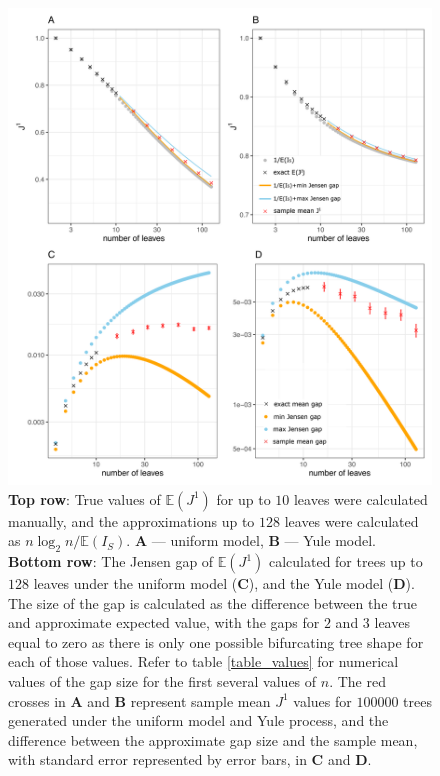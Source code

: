 \begin{figure}[h]
    \centering
    \includegraphics[width=\textwidth]{Chapter_2/figures/jensen_plots_final_edited.pdf}
    \caption{\textbf{Top row}: True values of $\mathbb E(J^1)$ for up to $10$
    leaves were calculated manually, and the approximations up to $128$ leaves
    were calculated as $n\log_2n/\mathbb E(I_S)$. \textbf{A} --- uniform model,
    \textbf{B} --- Yule model.\\
    \textbf{Bottom row}: The Jensen gap of $\mathbb{E}(J^1)$ calculated for
    trees up to $128$ leaves under the uniform model (\textbf{C}), and the Yule
    model (\textbf{D}). The size of the gap is calculated as the difference
    between the true and approximate expected value, with the gaps for $2$ and
    $3$ leaves equal to zero as there is only one possible bifurcating tree
    shape for each of those values. Refer to table \ref{table_values} for
    numerical values of the gap size for the first several values of $n$.
    The red crosses in \textbf{A} and \textbf{B} represent sample mean $J^1$
    values for $100000$ trees generated under the uniform model and Yule
    process, and the difference between the approximate gap size and the sample
    mean, with standard error represented by error bars, in \textbf{C} and
    \textbf{D}.}
    \label{jensenfig}
\end{figure}
